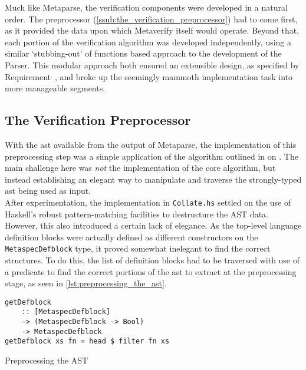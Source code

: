 Much like Metaparse, the verification components were developed in a natural order.
The preprocessor (\autoref{ssub:the_verification_preprocessor}) had to come first, as it provided the data upon which Metaverify itself would operate. 
Beyond that, each portion of the verification algorithm was developed independently, using a similar `stubbing-out' of functions based approach to the development of the Parser. 
This modular approach both ensured an extensible design, as specified by Requirement~, and broke up the seemingly mammoth implementation task into more manageable segments. 

\subsection{The Verification Preprocessor} %
\label{sub:the_verification_preprocessor}
With the \gls{ast} available from the output of Metaparse, the implementation of this preprocessing step was a simple application of the algorithm outlined in  on . 
The main challenge here was \textit{not} the implementation of the core algorithm, but instead establishing an elegant way to manipulate and traverse the strongly-typed \gls{ast} being used as input.\\

After experimentation, the implementation in \texttt{Collate.hs} settled on the use of Haskell's robust pattern-matching facilities to destructure the AST data.
However, this also introduced a certain lack of elegance. 
As the top-level language definition blocks were actually defined as different constructors on the \texttt{MetaspecDefblock} type, it proved somewhat inelegant to find the correct structures.
To do this, the list of definition blocks had to be traversed with use of a predicate to find the correct portions of the \gls{ast} to extract at the preprocessing stage, as seen in \autoref{lst:preprocessing_the_ast}.

\begin{listing}[!htb]
\begin{verbatim}
getDefblock
    :: [MetaspecDefblock]
    -> (MetaspecDefblock -> Bool)
    -> MetaspecDefblock
getDefblock xs fn = head $ filter fn xs
\end{verbatim}
\caption{Preprocessing the AST}
\label{lst:preprocessing_the_ast}
\end{listing}

